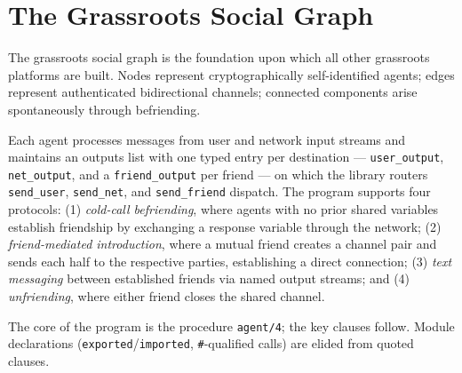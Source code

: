 \section{The Grassroots Social Graph}
\label{sec:ma-social-graph}

The grassroots social graph is the foundation upon which all other grassroots platforms are built. Nodes represent cryptographically self-identified agents; edges represent authenticated bidirectional channels; connected components arise spontaneously through befriending.

Each agent processes messages from user and network input streams and maintains an outputs list with one typed entry per destination --- \verb|user_output|, \verb|net_output|, and a \verb|friend_output| per friend --- on which the library routers \verb|send_user|, \verb|send_net|, and \verb|send_friend| dispatch. The program supports four protocols: (1) \emph{cold-call befriending}, where agents with no prior shared variables establish friendship by exchanging a response variable through the network; (2) \emph{friend-mediated introduction}, where a mutual friend creates a channel pair and sends each half to the respective parties, establishing a direct connection; (3) \emph{text messaging} between established friends via named output streams; and (4) \emph{unfriending}, where either friend closes the shared channel.

The core of the program is the procedure \verb|agent/4|; the key clauses follow. Module declarations (\verb|exported|/\verb|imported|, \verb|#|-qualified calls) are elided from quoted clauses.

